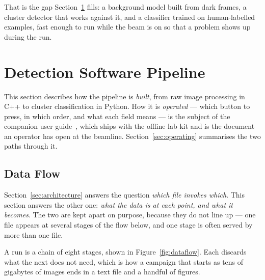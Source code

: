 \documentclass[a4paper,headsepline,oneside,11pt]{scrartcl}
\begin{document}
That is the gap Section~\ref{sec:pipeline} fills: a background model built from
dark frames, a cluster detector that works against it, and a classifier trained
on human-labelled examples, fast enough to run while the beam is on so that a
problem shows up during the run.




\FloatBarrier
\newpage

\section{Detection Software Pipeline}
\label{sec:pipeline}

This section describes how the pipeline is \emph{built}, from raw image
processing in C++ to cluster classification in Python. How it is
\emph{operated} --- which button to press, in which order, and what each field
means --- is the subject of the companion user guide~\cite{UserGuide}, which
ships with the offline lab kit and is the document an operator has open at the
beamline. Section~\ref{sec:operating} summarises the two paths through it.

\subsection{Data Flow}
\label{sec:dataflow}
Section~\ref{sec:architecture} answers the question \emph{which file invokes
which}. This section answers the other one: \emph{what the data is at each
point, and what it becomes}. The two are kept apart on purpose, because they do
not line up --- one file appears at several stages of the flow below, and one
stage is often served by more than one file.

A run is a chain of eight stages, shown in Figure~\ref{fig:dataflow}. Each
discards what the next does not need, which is how a campaign that starts as tens
of gigabytes of images ends in a text file and a handful of figures.
\end{document}
